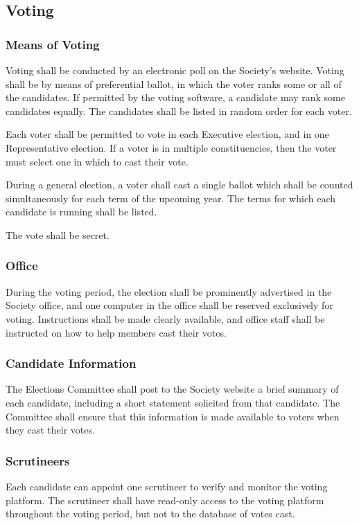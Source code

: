 \subsection{Voting}
\subsubsection{Means of Voting}
Voting shall be conducted by an electronic poll on the Society's website. Voting
shall be by means of preferential ballot, in which the voter ranks some or all
of the candidates. If permitted by the voting software, a candidate may rank
some candidates equally. The candidates shall be listed in random order for each
voter.

Each voter shall be permitted to vote in each Executive election, and in one
Representative election. If a voter is in multiple constituencies, then the
voter must select one in which to cast their vote.

During a general election, a voter shall cast a single ballot which shall be
counted simultaneously for each term of the upcoming year. The terms for which
each candidate is running shall be listed.

The vote shall be secret.

\subsubsection{Office}
During the voting period, the election shall be prominently advertised in the
Society office, and one computer in the office shall be reserved exclusively for
voting. Instructions shall be made clearly available, and office staff shall
be instructed on how to help members cast their votes.

\subsubsection{Candidate Information}
The Elections Committee shall post to the Society website a brief summary of
each candidate, including a short statement solicited from that candidate. The
Committee shall ensure that this information is made available to voters when
they cast their votes.

\subsubsection{Scrutineers}
Each candidate can appoint one scrutineer to verify and monitor the voting
platform. The scrutineer shall have read-only access to the voting platform
throughout the voting period, but not to the database of votes cast.

